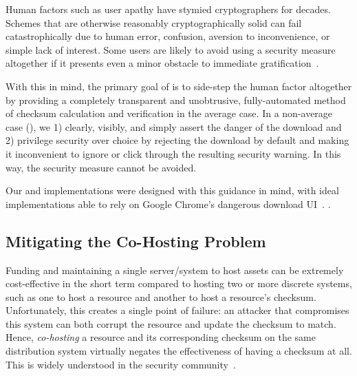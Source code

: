 Human factors such as user apathy have stymied cryptographers for decades.
Schemes that are otherwise reasonably cryptographically solid can fail
catastrophically due to human error, confusion, aversion to inconvenience, or
simple lack of interest. Some users are likely to avoid using a security measure
altogether if it presents even a minor obstacle to immediate
gratification~\cite{Clickthrough, PGPBad, Egelman1, Egelman2, Jenkins, Modic,
Reeder, Silic, Sunshine, Bianchi, Akhawe, Cherubini}.


With this in mind, the primary goal of \SYSTEM{} is to side-step the human
factor altogether by providing a completely transparent and unobtrusive,
fully-automated method of checksum calculation and verification in the average
case. In a non-average case (), we
1) clearly, visibly, and simply assert the danger of the download and 2)
privilege security over choice by rejecting the download by default and making
it inconvenient to ignore or click through the resulting security warning. In
this way, the security measure cannot be avoided.

Our \DNSSYS{} and \DHTSYS{} implementations were designed with this guidance in
mind, with ideal implementations able to rely on Google Chrome's dangerous
download UI~\cite{ChromeClickThrough}. .

\subsection{Mitigating the Co-Hosting Problem}

Funding and maintaining a single server/system to host assets can be extremely
cost-effective in the short term compared to hosting two or more discrete
systems, such as one to host a resource and another to host a resource's
checksum. Unfortunately, this creates a single point of failure: an attacker
that compromises this system can both corrupt the resource and update the
checksum to match. Hence, \emph{co-hosting} a resource and its
corresponding checksum on the same distribution system virtually negates the
effectiveness of having a checksum at all. This is widely understood in the
security community~\cite{SCA-MINT2, Cherubini, Stickler}.

